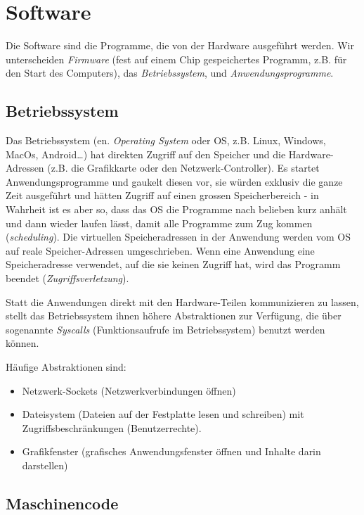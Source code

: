 \section{Software}

Die Software sind die Programme, die von der Hardware ausgeführt werden. Wir unterscheiden \emph{Firmware} (fest auf einem Chip gespeichertes Programm, z.B. für den Start des Computers), das \emph{Betriebssystem}, und \emph{Anwendungsprogramme}.

\subsection{Betriebssystem}

Das Betriebssystem (en. \emph{Operating System} oder OS, z.B. Linux, Windows, MacOs, Android…) hat direkten Zugriff auf den Speicher und die Hardware-Adressen (z.B. die Grafikkarte oder den Netzwerk-Controller). Es startet Anwendungsprogramme und gaukelt diesen vor, sie würden exklusiv die ganze Zeit ausgeführt und hätten Zugriff auf einen grossen Speicherbereich - in Wahrheit ist es aber so, dass das OS die Programme nach belieben kurz anhält und dann wieder laufen lässt, damit alle Programme zum Zug kommen (\emph{scheduling}). Die virtuellen Speicheradressen in der Anwendung werden vom OS auf reale Speicher-Adressen umgeschrieben. Wenn eine Anwendung eine Speicheradresse verwendet, auf die sie keinen Zugriff hat, wird das Programm beendet (\emph{Zugriffsverletzung}). 

Statt die Anwendungen direkt mit den Hardware-Teilen kommunizieren zu lassen, stellt das Betriebssystem ihnen höhere Abstraktionen zur Verfügung, die über sogenannte \emph{Syscalls} (Funktionsaufrufe im Betriebssystem) benutzt werden können.

Häufige Abstraktionen sind:

\begin{itemize}
    \item Netzwerk-Sockets (Netzwerkverbindungen öffnen)
    \item Dateisystem (Dateien auf der Festplatte lesen und schreiben) mit Zugriffsbeschränkungen (Benutzerrechte).
    \item Grafikfenster (grafisches Anwendungsfenster öffnen und Inhalte darin darstellen)
\end{itemize}

\subsection{Maschinencode}

